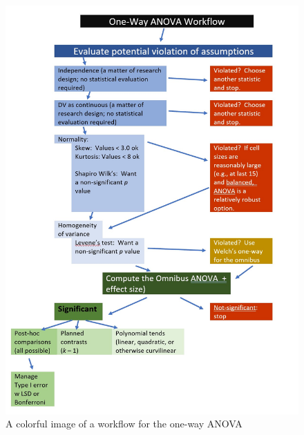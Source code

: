 \documentclass[
  11pt,
]{book}
\begin{document}
\begin{figure}
\centering
\includegraphics{images/oneway/OnewayWrkFlw.jpg}
\caption{A colorful image of a workflow for the one-way ANOVA}
\end{figure}
\end{document}
